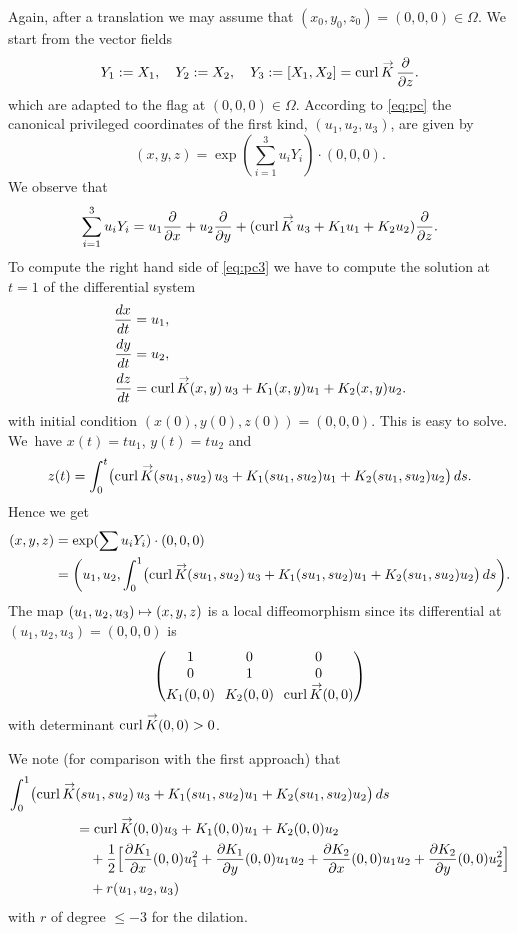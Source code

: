 \documentclass[10pt]{amsart}
\newcommand\mto{\mathchoice{\longmapsto}{\mapsto}{\mapsto}{\mapsto}}
\DeclareMathOperator{\curl}{curl}
\renewcommand{\vec}[1]
{\overset{\,{\raisebox{-2pt}{$\scriptstyle\to$}}}{#1}}
\theoremstyle{definition}
\newcommand{\1}{\mathbbm{1}}
\begin{document}
Again, after a translation we may assume that $(x_0,y_0,z_0)= (0,0,0)\in\Omega$.
We start from the vector fields
\[
Y_1:=X_1,\quad
Y_2:=X_2,\quad
Y_3:=[X_1,X_2] = \curl \vec K\,\frac{\partial}{\partial z}.
\]
which are adapted to the flag at $(0,0,0)\in\Omega$. According to \eqref{eq:pc} the canonical privileged coordinates of the first kind, $(u_1,u_2,u_3)$, are given by
\begin{equation}\label{eq:pc3}
(x,y,z)= \exp (\sum_{i=1}^3 u_{i}Y_i) \cdot (0,0,0).
\end{equation}
We observe that
\[
\sum_{i=1}^3 u_{i}Y_i = u_1 \frac{\partial}{\partial x} + u_2 \frac{\partial}{\partial y} +(\curl \vec K\,u_3 + K_1 u_1 + K_2 u_2) \frac{\partial}{\partial z}.
\]
To compute the right hand side of \eqref{eq:pc3} we have to compute the solution at $t=1$ of the differential system
\begin{align*}
\frac{dx}{dt} &=u_1,\\
\frac{dy}{dt} &=u_2, \\
\frac{dz}{dt} &= \curl \vec K (x,y)\,u_3 + K_1(x,y) u_1 + K_2 (x,y)u_2.
\end{align*}
with initial condition $(x(0),y(0),z(0))=(0,0,0)$.
This is easy to solve. We~have $x(t)= tu_1$, $y(t) =t u_2$ and
\[
z(t) = \int_0^t \bigl(\curl \vec K (su_1,su_2)\,u_3 + K_1(su_1,su_2) u_1 + K_2 (su_1,su_2)u_2\bigr)\,ds.
\]
Hence we get
\begin{align*}
(x,y,z) & =\exp (\sum u_{i}Y_i) \cdot (0,0,0)\\
&= \biggl(u_1,u_2, \int_0^1\bigl(\curl \vec K (su_1,su_2)\,u_3 + K_1(su_1,su_2) u_1 + K_2 (su_1,su_2)u_2\bigr) \,ds\biggr).
\end{align*}
The map $(u_1,u_2,u_3) \mto (x,y,z)$ is a local diffeomorphism since its differential at $(u_1,u_2,u_3)=(0,0,0)$ is
\[\arraycolsep3.5pt
\begin{pmatrix}
1&0&0\\
0&1&0\\
K_1(0,0)&K_2(0,0)&\curl \vec K (0,0)
\end{pmatrix}
\]
with determinant $\curl \vec K (0,0)>0$.

We note (for comparison with the first approach) that
\begin{align*}
\int_0^1\bigl(\curl \vec K &(su_1,su_2)\,u_3 + K_1(su_1,su_2) u_1 + K_2 (su_1,su_2)u_2\bigr)\,ds \\
& = \curl \vec K (0,0) u_3 + K_1(0,0) u_1+ K_2(0,0) u_2\\
& \quad
+ \frac12 \Big[ \frac{\partial K_1}{\partial x}(0,0) u_1^2+ \frac{\partial K_1}{\partial y}(0,0) u_1u_2 + \frac{\partial K_2}{\partial x}(0,0) u_1u_2 + \frac{\partial K_2}{\partial y}(0,0) u_2^2\Big]\\
& \quad + r(u_1,u_2,u_3)
\end{align*}
with $r$ of degree $\leq -3$ for the dilation.
\end{document}
